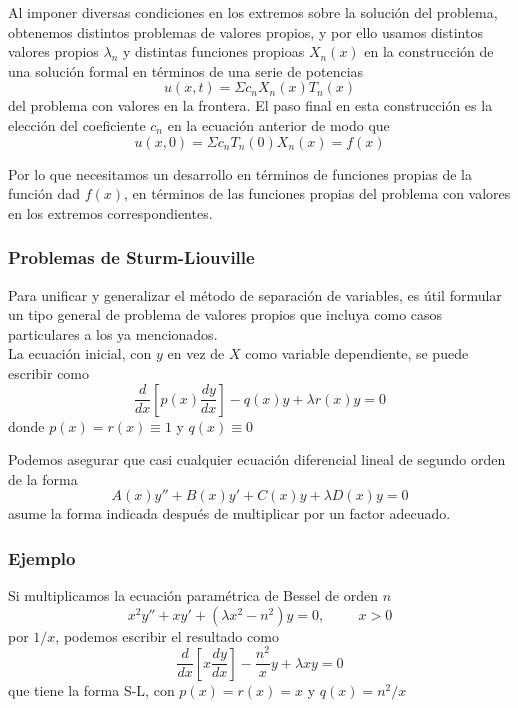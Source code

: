 \begin{frame}
Al imponer diversas condiciones en los extremos sobre la soluci\'{o}n del problema, obtenemos distintos problemas de valores propios, y por ello usamos distintos valores propios ${\lambda_{n}}$ y distintas funciones propioas $X_{n}(x)$ en la construcci\'{o}n de una soluci\'{o}n formal en t\'{e}rminos de una serie de potencias
\[ u(x,t) = \Sigma c_{n} X_{n}(x) T_{n}(x)\]
del problema con valores en la frontera. El paso final en esta construcci\'{o}n es la elecci\'{o}n del coeficiente ${c_{n}}$ en la ecuaci\'{o}n anterior de modo que
\[u(x,0) = \Sigma c_{n} T_{n}(0)X_{n}(x)= f(x) \]
\end{frame}
\begin{frame}
Por lo que necesitamos un desarrollo en t\'{e}rminos de funciones propias de la funci\'{o}n dad $f(x)$, en t\'{e}rminos de las funciones propias del problema con valores en los extremos correspondientes.
\end{frame}
\begin{frame}
\frametitle{Problemas de Sturm-Liouville}
Para unificar y generalizar el m\'{e}todo de separaci\'{o}n de variables, es \'{u}til formular un tipo general de problema de valores propios que incluya como casos particulares a los ya mencionados.
\\
\bigskip
La ecuaci\'{o}n inicial, con $y$ en vez de $X$ como variable dependiente, se puede escribir como
\[ \dfrac{d}{dx} \left[ p(x) \dfrac{dy}{dx} \right] - q(x) y + \lambda r(x) y = 0\]
donde $p(x)=r(x) \equiv 1$ y $q(x) \equiv 0$
\end{frame}
\begin{frame}
Podemos asegurar que casi cualquier ecuaci\'{o}n diferencial lineal de segundo orden de la forma
\[ A(x) y'' + B(x) y' + C(x) y + \lambda D(x) y = 0\]
asume la forma indicada despu\'{e}s de multiplicar por un factor adecuado.
\end{frame}
\begin{frame}
\frametitle{Ejemplo}
Si multiplicamos la ecuaci\'{o}n param\'{e}trica de Bessel de orden $n$
\[ x^{2} y'' + xy' + (\lambda x^{2} - n^{2}) y = 0, \hspace{1cm} x>0\]
por $1/x$, podemos escribir el resultado como
\[ \dfrac{d}{dx} \left[ x \dfrac{dy}{dx} \right] - \dfrac{n^{2}}{x}y + \lambda x y = 0\]
que tiene la forma S-L, con $p(x)=r(x)= x$ y $q(x) = n^{2}/x$
\end{frame}
